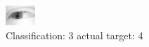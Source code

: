\begin{figure}[h!]
\begin{center}
\includegraphics[width=0.60\columnwidth]{figures/ID2410_class_3_target_4.png}
\end{center}
\caption{ Classification: 3 actual target: 4}
\label{fig:ID2410_class_3_target_4}
\end{figure}
